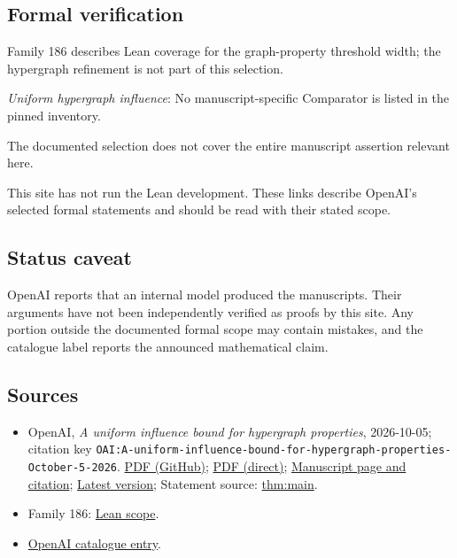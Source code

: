 \documentclass[11pt]{article}
\begin{document}
\subsection{Formal verification}
Family 186 describes Lean coverage for the graph-property threshold width; the hypergraph refinement is not part of this selection.

\textit{Uniform hypergraph influence}: No manuscript-specific Comparator is listed in the pinned inventory.

The documented selection does not cover the entire manuscript assertion relevant here.

This site has not run the Lean development. These links describe OpenAI’s selected formal statements and should be read with their stated scope.

\subsection{Status caveat}
OpenAI reports that an internal model produced the manuscripts. Their arguments have not been independently verified as proofs by this site. Any portion outside the documented formal scope may contain mistakes, and the catalogue label reports the announced mathematical claim.

\subsection{Sources}
\begin{itemize}
\item OpenAI, \emph{A uniform influence bound for hypergraph properties}, 2026-10-05; citation key \texttt{OAI:A-uniform-influence-bound-for-hypergraph-properties-October-5-2026}. \href{https://github.com/openai/math/blob/adc7f1241b42e322a6451854ab7e4b4c146bf78a/preprints/A-uniform-influence-bound-for-hypergraph-properties-October-5-2026/hypergraph-influences.pdf}{PDF (GitHub)}; \href{https://github.com/openai/math/raw/adc7f1241b42e322a6451854ab7e4b4c146bf78a/preprints/A-uniform-influence-bound-for-hypergraph-properties-October-5-2026/hypergraph-influences.pdf}{PDF (direct)}; \href{https://github.com/openai/math/blob/adc7f1241b42e322a6451854ab7e4b4c146bf78a/preprints/A-uniform-influence-bound-for-hypergraph-properties-October-5-2026/README.md}{Manuscript page and citation}; \href{https://github.com/openai/math/blob/main/preprints/A-uniform-influence-bound-for-hypergraph-properties-October-5-2026/hypergraph-influences.pdf}{Latest version}; Statement source: \href{https://github.com/openai/math/blob/adc7f1241b42e322a6451854ab7e4b4c146bf78a/preprints/A-uniform-influence-bound-for-hypergraph-properties-October-5-2026/build/introduction.tex\#L24}{thm:main}.
\item Family 186: \href{https://github.com/openai/math/blob/adc7f1241b42e322a6451854ab7e4b4c146bf78a/lean/docs/186.md}{Lean scope}.
\item \href{https://github.com/openai/math/blob/adc7f1241b42e322a6451854ab7e4b4c146bf78a/CONTENTS.md}{OpenAI catalogue entry}.
\end{itemize}
\end{document}
